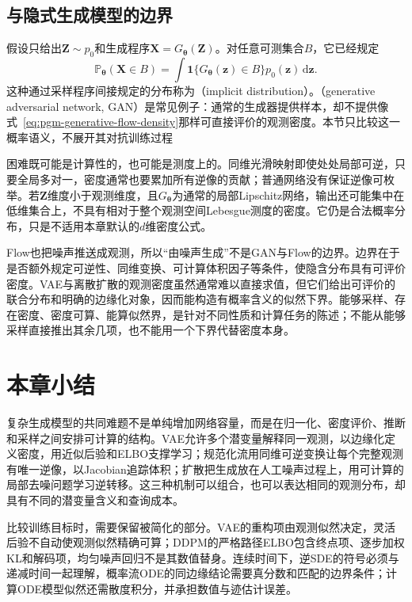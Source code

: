 \subsection{与隐式生成模型的边界}
\label{sec:pgm-generative-implicit-boundary}

假设只给出$\bm{Z}\sim p_0$和生成程序$\bm{X}=G_{\bm{\theta}}(\bm{Z})$。对任意可测集合$B$，它已经规定
\begin{equation}
  \label{eq:pgm-generative-pushforward}
  \mathbb{P}_{\bm{\theta}}(\bm{X}\in B)
  =\int \mathbf{1}\{G_{\bm{\theta}}(\bm{z})\in B\}
           p_0(\bm{z})\,\mathrm{d}\bm{z}.
\end{equation}
这种通过采样程序间接规定的分布称为（implicit distribution）。（generative adversarial network, GAN）是常见例子：通常的生成器提供样本，却不提供像式~\eqref{eq:pgm-generative-flow-density}那样可直接评价的观测密度。本节只比较这一概率语义，不展开其对抗训练过程

困难既可能是计算性的，也可能是测度上的。同维光滑映射即使处处局部可逆，只要全局多对一，密度通常也要累加所有逆像的贡献；普通网络没有保证逆像可枚举。若$\bm{Z}$维度小于观测维度，且$G_{\bm{\theta}}$为通常的局部Lipschitz网络，输出还可能集中在低维集合上，不具有相对于整个观测空间Lebesgue测度的密度。它仍是合法概率分布，只是不适用本章默认的$d$维密度公式。

Flow也把噪声推送成观测，所以“由噪声生成”不是GAN与Flow的边界。边界在于是否额外规定可逆性、同维变换、可计算体积因子等条件，使隐含分布具有可评价密度。VAE与离散扩散的观测密度虽然通常难以直接求值，但它们给出可评价的联合分布和明确的边缘化对象，因而能构造有概率含义的似然下界。能够采样、存在密度、密度可算、能算似然界，是针对不同性质和计算任务的陈述；不能从能够采样直接推出其余几项，也不能用一个下界代替密度本身。

\section{本章小结}
\label{sec:pgm-generative-summary}

复杂生成模型的共同难题不是单纯增加网络容量，而是在归一化、密度评价、推断和采样之间安排可计算的结构。VAE允许多个潜变量解释同一观测，以边缘化定义密度，用近似后验和ELBO支撑学习；规范化流用同维可逆变换让每个完整观测有唯一逆像，以Jacobian追踪体积；扩散把生成放在人工噪声过程上，用可计算的局部去噪问题学习逆转移。这三种机制可以组合，也可以表达相同的观测分布，却具有不同的潜变量含义和查询成本。

比较训练目标时，需要保留被简化的部分。VAE的重构项由观测似然决定，灵活后验不自动使观测似然精确可算；DDPM的严格路径ELBO包含终点项、逐步加权KL和解码项，均匀噪声回归不是其数值替身。连续时间下，逆SDE的符号必须与递减时间一起理解，概率流ODE的同边缘结论需要真分数和匹配的边界条件；计算ODE模型似然还需散度积分，并承担数值与迹估计误差。

